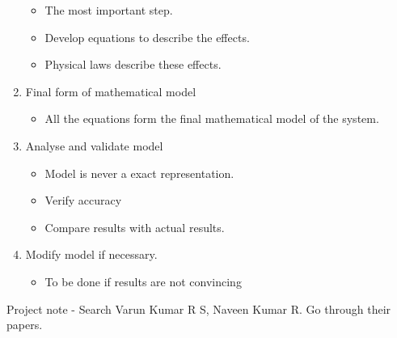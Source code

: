 \documentclass[twoside]{report}
\begin{document}
\begin{enumerate}
		\begin{itemize}
			\item The most important step.
			\item Develop equations to describe the effects.
			\item Physical laws describe these effects.
		\end{itemize}
	\item Final form of mathematical model
		\begin{itemize}
			\item All the equations form the final mathematical model of the system.
		\end{itemize}
	\item Analyse and validate model
		\begin{itemize}
			\item Model is never a exact representation. 
			\item Verify accuracy
			\item Compare results with actual results.
		\end{itemize}
	\item Modify model if necessary.
		\begin{itemize}
			\item To be done if results are not convincing
		\end{itemize}
\end{enumerate}
\begin{note}
	Project note - Search Varun Kumar R S, Naveen Kumar R. Go through their papers.
\end{note}
\end{document}

